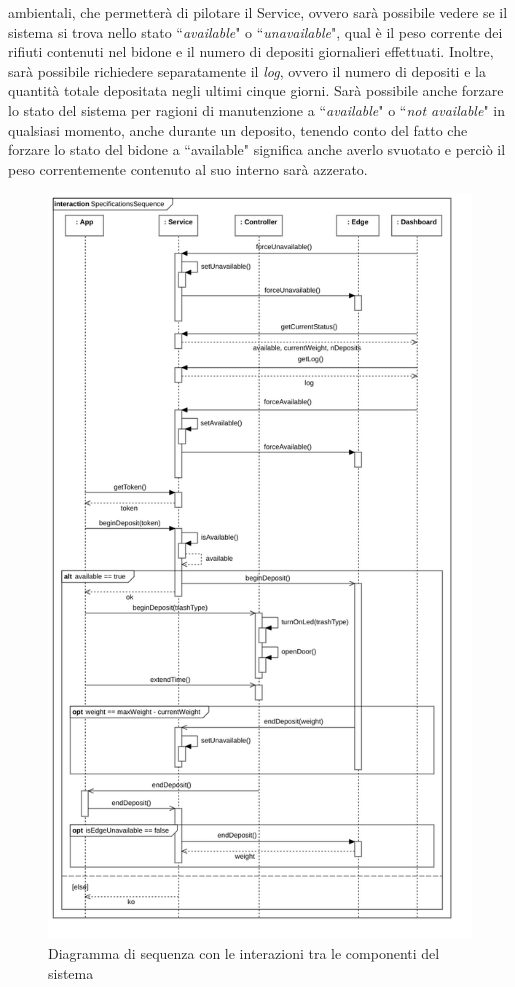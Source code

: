 \documentclass[a4paper, 12pt]{report}
\begin{document}
	ambientali, che permetterà di pilotare il Service,
	ovvero sarà possibile vedere se il sistema si trova nello stato ``\textit{available}" o
	``\textit{unavailable}", qual è il peso corrente dei rifiuti contenuti nel bidone e il numero di
	depositi giornalieri effettuati. Inoltre, sarà possibile richiedere separatamente il \textit{log},
	ovvero il numero di depositi e la quantità totale depositata negli ultimi cinque giorni. Sarà
	possibile anche forzare lo stato del sistema per ragioni di manutenzione a ``\textit{available}" o
	``\textit{not available}" in qualsiasi momento, anche durante un deposito, tenendo conto del fatto
	che forzare lo stato del bidone a ``available" significa anche averlo svuotato e perciò il peso
	correntemente contenuto al suo interno sarà azzerato.
	\begin{figure}[H]
		\centering
		\includegraphics[height=\textheight]{"img/Sequence.png"}    
		\caption{Diagramma di sequenza con le interazioni tra le componenti del sistema}
	\end{figure}
\end{document}
